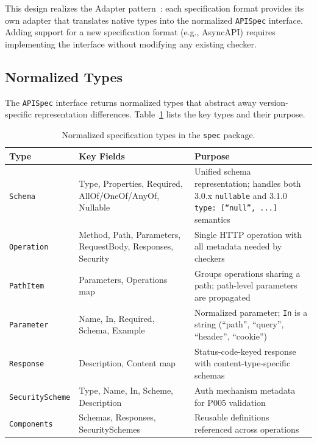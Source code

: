 This design realizes the Adapter pattern~\cite{gof}: each specification format provides its own adapter that translates native types into the normalized \texttt{APISpec} interface. Adding support for a new specification format (e.g., AsyncAPI) requires implementing the interface without modifying any existing checker.

\subsection{Normalized Types}
\label{subsec:normalized-types}

The \texttt{APISpec} interface returns normalized types that abstract away version-specific representation differences. Table~\ref{tab:normalized-types} lists the key types and their purpose.

\begin{table}[htbp]
\centering
\caption{Normalized specification types in the \texttt{spec} package.}
\label{tab:normalized-types}
\small
\begin{tabular}{@{}llp{6.5cm}@{}}
\toprule
\textbf{Type} & \textbf{Key Fields} & \textbf{Purpose} \\
\midrule
\texttt{Schema}       & Type, Properties, Required, AllOf/OneOf/AnyOf, Nullable & Unified schema representation; handles both 3.0.x \texttt{nullable} and 3.1.0 \texttt{type: [``null'', ...]} semantics \\
\texttt{Operation}    & Method, Path, Parameters, RequestBody, Responses, Security & Single HTTP operation with all metadata needed by checkers \\
\texttt{PathItem}     & Parameters, Operations map & Groups operations sharing a path; path-level parameters are propagated \\
\texttt{Parameter}    & Name, In, Required, Schema, Example & Normalized parameter; \texttt{In} is a string (``path'', ``query'', ``header'', ``cookie'') \\
\texttt{Response}     & Description, Content map & Status-code-keyed response with content-type-specific schemas \\
\texttt{SecurityScheme} & Type, Name, In, Scheme, Description & Auth mechanism metadata for P005 validation \\
\texttt{Components}   & Schemas, Responses, SecuritySchemes & Reusable definitions referenced across operations \\
\bottomrule
\end{tabular}
\end{table}

